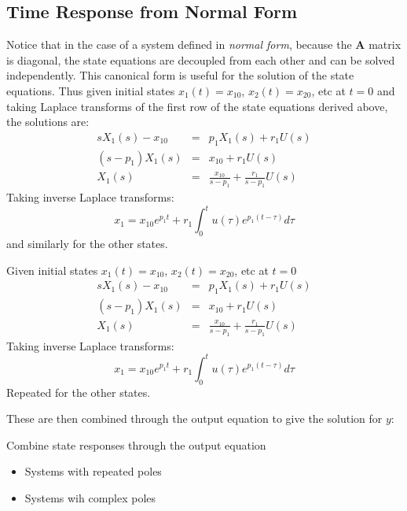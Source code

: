 \subsection*{Time Response from Normal Form}

Notice that in the case of a system defined in \emph{normal form}, because the $\mathbf{A}$ matrix is diagonal, the state equations are decoupled from each other and can be solved independently. This canonical form is useful for the solution of the state equations. Thus given initial states $x_1(t)=x_{10}$, $x_2(t)=x_{20}$, etc at $t=0$ and taking Laplace transforms of the first row of the state equations derived above, the solutions are:
\begin{eqnarray*}
 sX_1 (s) - x_{10}  & = & p_1 X_1 (s) + r_1 U(s) \\
 (s - p_1 )X_1 (s) & = & x_{10}  + r_1 U(s) \\
 X_1 (s) & = & \frac{{x_{10} }}{{s - p_1 }} + \frac{{r_1 }}{{s - p_1 }}U(s)
\end{eqnarray*}
Taking inverse Laplace transforms:
\[ x_1 = x_{10}e^{p_1t}+r_1\int_0^tu(\tau)e^{p_1(t-\tau)}d\tau \]
and similarly for the other states.
\ifslidesonly
\begin{slide}
	Given initial states $x_1(t)=x_{10}$, $x_2(t)=x_{20}$, etc at $t=0$
	\begin{eqnarray*}
	 sX_1 (s) - x_{10}  & = & p_1 X_1 (s) + r_1 U(s) \\
	 (s - p_1 )X_1 (s) & = & x_{10}  + r_1 U(s) \\
	 X_1 (s) & = & \frac{{x_{10} }}{{s - p_1 }} + \frac{{r_1 }}{{s - p_1 }}U(s)
	\end{eqnarray*}
	Taking inverse Laplace transforms:
	\[ x_1 = x_{10}e^{p_1t}+r_1\int_0^tu(\tau)e^{p_1(t-\tau)}d\tau \]
	Repeated for the other states.
\end{slide}
\fi

These are then combined through the output equation to give the solution for $y$:

\ifslidesonly
\begin{slide}
	Combine state responses through the output equation
	
\end{slide}
\fi

\ifslidesonly
\begin{slide}
\begin{itemize}
\item Systems with repeated poles
\item Systems wih complex poles
\end{itemize}
\end{slide}
\fi

